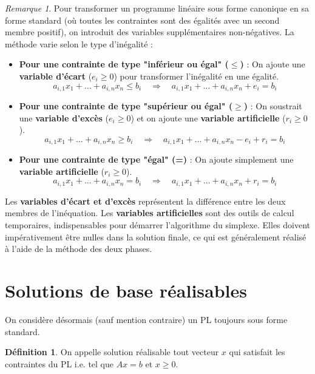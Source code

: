 \documentclass[a4paper,12pt,openany]{book}
\theoremstyle{plain}
\theoremstyle{definition}
\newtheorem{definition}[theorem]{Définition}
\theoremstyle{remark}
\newtheorem{remarque}[theorem]{Remarque}
\theoremstyle{nbstyle}
\begin{document}
	\begin{remarque}
		Pour transformer un programme linéaire sous forme canonique en sa forme standard (où toutes les contraintes sont des égalités avec un second membre positif), on introduit des variables supplémentaires non-négatives. La méthode varie selon le type d'inégalité :
		\begin{itemize}
			\item \textbf{Pour une contrainte de type "inférieur ou égal" ($\leq$)} : On ajoute une \textbf{variable d'écart} ($e_i \geq 0$) pour transformer l'inégalité en une égalité.
			\[ a_{i,1}x_1 + \dots + a_{i,n}x_n \leq b_i \quad \Rightarrow \quad a_{i,1}x_1 + \dots + a_{i,n}x_n + e_i = b_i \]
			
			\item \textbf{Pour une contrainte de type "supérieur ou égal" ($\geq$)} : On soustrait une \textbf{variable d'excès} ($e_i \geq 0$) et on ajoute une \textbf{variable artificielle} ($r_i \geq 0$).
			\[ a_{i,1}x_1 + \dots + a_{i,n}x_n \geq b_i \quad \Rightarrow \quad a_{i,1}x_1 + \dots + a_{i,n}x_n - e_i + r_i = b_i \]
			
			\item \textbf{Pour une contrainte de type "égal" (=)} : On ajoute simplement une \textbf{variable artificielle} ($r_i \geq 0$).
			\[ a_{i,1}x_1 + \dots + a_{i,n}x_n = b_i \quad \Rightarrow \quad a_{i,1}x_1 + \dots + a_{i,n}x_n + r_i = b_i \]
		\end{itemize}
		Les \textbf{variables d'écart et d'excès} représentent la différence entre les deux membres de l'inéquation. Les \textbf{variables artificielles} sont des outils de calcul temporaires, indispensables pour démarrer l'algorithme du simplexe. Elles doivent impérativement être nulles dans la solution finale, ce qui est généralement réalisé à l'aide de la méthode des deux phases.
	\end{remarque}
	
	\section{Solutions de base réalisables}
	
	On considère désormais (sauf mention contraire) un PL toujours sous forme standard.
	
	\begin{definition}
		On appelle solution réalisable tout vecteur $x$ qui satisfait les contraintes du PL i.e. tel que $A x=b$ et $x \geq 0$.
	\end{definition}
	\label{def:2.1}
	
\end{document}

